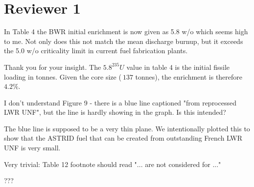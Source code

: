\documentclass[answers,11pt]{exam}
\begin{document}
\section*{Reviewer 1}
\begin{questions}
    \question In Table 4 the BWR initial enrichment is now given as 5.8 w/o which seems high to me. Not only does this not match the mean discharge burnup, but it exceeds the 5.0 w/o criticality limit in current fuel fabrication plants. 

    \begin{solution}
    Thank you for your insight. The $5.8 ^{235}U$ value in table 4
    is the initial fissile loading in tonnes. Given the core size
    ($~137$ tonnes), the enrichment is therefore $4.2\%$.
    \end{solution}


    \question I don't understand Figure 9 - there is a blue line captioned "from reprocessed LWR UNF", but the line is hardly showing in the graph. Is this intended?

    \begin{solution}
    The blue line is supposed to be a very thin plane. We intentionally
    plotted this to show that the ASTRID fuel that can be created
    from outstanding French \gls{LWR} \gls{UNF} is very small.
    \end{solution}

    \question Very trivial: Table 12 footnote should read "... are not considered for ..."

    \begin{solution}
    ???
    \end{solution}


\end{questions}
\end{document}
